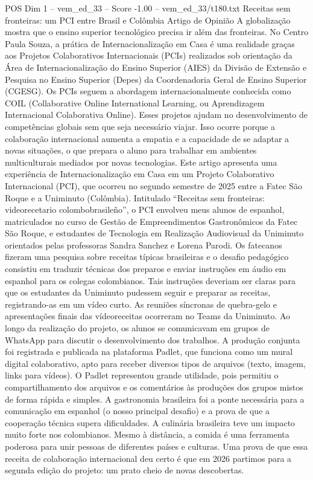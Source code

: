 \begin{textsample}{POS Dim 1 – vem\_ed\_33 – Score -1.00 – vem\_ed\_33/t180.txt}  \label{ex:f1_pos_071}
Receitas sem fronteiras: um PCI entre Brasil e Colômbia Artigo de Opinião A globalização mostra que o ensino superior tecnológico precisa ir além das fronteiras.
No Centro Paula Souza, a prática de Internacionalização em Casa é uma realidade graças aos Projetos Colaborativos Internacionais (PCIs) realizados sob orientação da Área de Internacionalização do Ensino Superior (AIES) da Divisão de Extensão e Pesquisa no Ensino Superior (Depes) da Coordenadoria Geral de Ensino Superior (CGESG).
Os PCIs seguem a abordagem internacionalmente conhecida como COIL (Collaborative Online International Learning, ou Aprendizagem Internacional Colaborativa Online).
Esses projetos ajudam no desenvolvimento de competências globais sem que seja necessário viajar.
Isso ocorre porque a colaboração internacional aumenta a empatia e a capacidade de se adaptar a novas situações, o que prepara o aluno para trabalhar em ambientes multiculturais mediados por novas tecnologias.
Este artigo apresenta uma experiência de Internacionalização em Casa em um Projeto Colaborativo Internacional (PCI), que ocorreu no segundo semestre de 2025 entre a Fatec São Roque e a Uniminuto (Colômbia).
Intitulado “Receitas sem fronteiras: videorecetario colombobrasileño”, o PCI envolveu meus alunos de espanhol, matriculados no curso de Gestão de Empreendimentos Gastronômicos da Fatec São Roque, e estudantes de Tecnologia em Realização Audiovisual da Uniminuto orientados pelas professoras Sandra Sanchez e Lorena Parodi.
Os fatecanos fizeram uma pesquisa sobre receitas típicas brasileiras e o desafio pedagógico consistiu em traduzir técnicas dos preparos e enviar instruções em áudio em espanhol para os colegas colombianos.
Tais instruções deveriam ser claras para que os estudantes da Uniminuto pudessem seguir e preparar as receitas, registrando-as em um vídeo curto.
As reuniões síncronas de quebra-gelo e apresentações finais das vídeoreceitas ocorreram no Teams da Uniminuto.
Ao longo da realização do projeto, os alunos se comunicavam em grupos de WhatsApp para discutir o desenvolvimento dos trabalhos.
A produção conjunta foi registrada e publicada na plataforma Padlet, que funciona como um mural digital colaborativo, apto para receber diversos tipos de arquivos (texto, imagem, links para vídeos).
O Padlet representou grande utilidade, pois permitiu o compartilhamento dos arquivos e os comentários às produções dos grupos mistos de forma rápida e simples.
A gastronomia brasileira foi a ponte necessária para a comunicação em espanhol (o nosso principal desafio) e a prova de que a cooperação técnica supera dificuldades.
A culinária brasileira teve um impacto muito forte nos colombianos.
Mesmo à distância, a comida é uma ferramenta poderosa para unir pessoas de diferentes países e culturas.
Uma prova de que essa receita de colaboração internacional deu certo é que em 2026 partimos para a segunda edição do projeto: um prato cheio de novas descobertas.

\end{textsample}

